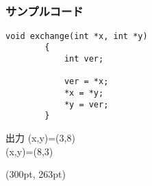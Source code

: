 \documentclass[dvipdfmx]{beamer}
\begin{document}
\subsection{}
\begin{frame}[t, fragile]
    \frametitle{サンプルコード}
    \begin{lstlisting}[gobble=8, caption=pra\_pointer.c]
        void exchange(int *x, int *y)
        {
            int ver;

            ver = *x;
            *x = *y;
            *y = ver;
        }
    \end{lstlisting}
    \begin{block}{出力}
        (x,y)=(3,8)\\
        (x,y)=(8,3)
    \end{block}
    \begin{textblock*}{0.3\linewidth}(300pt, 263pt)
        \space
    \end{textblock*}
\end{frame}
\end{document}
